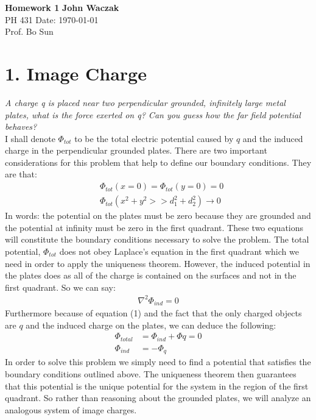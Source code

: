 \documentclass[a4paper, 11pt]{article}
\begin{document}
\noindent
\large\textbf{Homework 1} \hfill \textbf{John Waczak} \\
\normalsize PH 431 \hfill  Date: \today \\
Prof. Bo Sun  \\


\section*{1. Image Charge}
\textit{A charge q is placed near two perpendicular grounded, infinitely large metal plates,
	what is the force exerted on q? Can you guess how the far field potential behaves?} \\ 

I shall denote $\Phi_{tot}$ to be the total electric potential caused by $q$ and the induced charge in the perpendicular grounded plates. There are two important considerations for this problem that help to define our boundary conditions. They are that: 
	\begin{align}
		&\Phi_{tot}(x=0) = \Phi_{tot}(y=0) = 0 \\ 
		&\Phi_{tot}(x^2+y^2>>d_1^2+d_2^2) \rightarrow 0
	\end{align}
In words: the potential on the plates must be zero because they are grounded and the potential at infinity must be zero in the first quadrant. These two equations will constitute the boundary conditions necessary to solve the problem. The total potential, $\Phi_{tot}$ does not obey Laplace's equation in the first quadrant which we need in order to apply the uniqueness theorem. However, the induced potential in the plates does as all of the charge is contained on the surfaces and not in the first quadrant. So we can say: 
	\begin{align}
		\nabla^2 \Phi_{ind} = 0
	\end{align}
Furthermore because of equation (1) and the fact that the only charged objects are $q$ and the induced charge on the plates, we can deduce the following: 
	\begin{align}
		\Phi_{total} &= \Phi_{ind}+\Phi{q} = 0\\ 
		\Phi_{ind} &= -\Phi_{q}
	\end{align}
In order to solve this problem we simply need to find a potential that satisfies the boundary conditions outlined above. The uniqueness theorem then guarantees that this potential is the unique potential for the system in the region of the first quadrant. So rather than reasoning about the grounded plates, we will analyze an analogous system of image charges. \\
\end{document}
